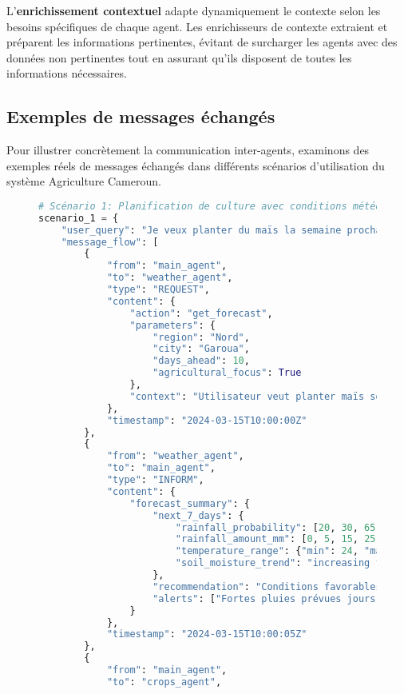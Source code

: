 L'\textbf{enrichissement contextuel} adapte dynamiquement le contexte selon les besoins spécifiques de chaque agent. Les enrichisseurs de contexte extraient et préparent les informations pertinentes, évitant de surcharger les agents avec des données non pertinentes tout en assurant qu'ils disposent de toutes les informations nécessaires.

\subsection{Exemples de messages échangés}

Pour illustrer concrètement la communication inter-agents, examinons des exemples réels de messages échangés dans différents scénarios d'utilisation du système Agriculture Cameroun.

\begin{figure}[H]
\centering
\begin{lstlisting}[language=Python, caption=Exemples de communications inter-agents en action]
# Scénario 1: Planification de culture avec conditions météo
scenario_1 = {
    "user_query": "Je veux planter du maïs la semaine prochaine à Garoua",
    "message_flow": [
        {
            "from": "main_agent",
            "to": "weather_agent",
            "type": "REQUEST",
            "content": {
                "action": "get_forecast",
                "parameters": {
                    "region": "Nord",
                    "city": "Garoua",
                    "days_ahead": 10,
                    "agricultural_focus": True
                },
                "context": "Utilisateur veut planter maïs semaine prochaine"
            },
            "timestamp": "2024-03-15T10:00:00Z"
        },
        {
            "from": "weather_agent",
            "to": "main_agent",
            "type": "INFORM",
            "content": {
                "forecast_summary": {
                    "next_7_days": {
                        "rainfall_probability": [20, 30, 65, 80, 75, 40, 25],
                        "rainfall_amount_mm": [0, 5, 15, 25, 20, 8, 3],
                        "temperature_range": {"min": 24, "max": 38},
                        "soil_moisture_trend": "increasing from day 3"
                    },
                    "recommendation": "Conditions favorables à partir du jour 3",
                    "alerts": ["Fortes pluies prévues jours 4-5"]
                }
            },
            "timestamp": "2024-03-15T10:00:05Z"
        },
        {
            "from": "main_agent",
            "to": "crops_agent",

\end{lstlisting}
\end{figure}
